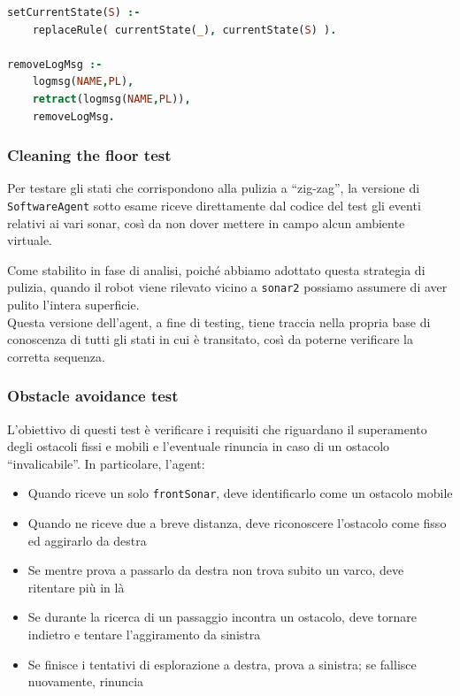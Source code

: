 \documentclass{../llncs}
\newcommand{\codescript}[1]{{\mbox{\small{\texttt{#1}}}}\xspace}
\newcommand{\code}[1]{{\color{blue}\small{\texttt{#1}}}}
\newcommand{\labelssec}[1]{\label{ssec:#1}}
\begin{document}
\begin{lstlisting}[language=Prolog, keywordstyle=\color{black}, caption={swag1 Rules}]
setCurrentState(S) :-
	replaceRule( currentState(_), currentState(S) ).
	 		
removeLogMsg :-
	logmsg(NAME,PL),
	retract(logmsg(NAME,PL)),
	removeLogMsg.
\end{lstlisting}

\subsubsection{Cleaning the floor test}
\labelssec{cleaningTest}
Per testare gli stati che corrispondono alla pulizia a ``zig-zag'', la versione di \codescript{SoftwareAgent} sotto esame riceve direttamente dal codice del test gli eventi relativi ai vari sonar, così da non dover mettere in campo alcun ambiente virtuale.

Come stabilito in fase di analisi, poiché abbiamo adottato questa strategia di pulizia, quando il robot viene rilevato vicino a \code{sonar2} possiamo assumere di aver pulito l'intera superficie.\\



Questa versione dell'agent, a fine di testing, tiene traccia nella propria base di conoscenza di tutti gli stati in cui è transitato, così da poterne verificare la corretta sequenza.\\



\subsubsection{Obstacle avoidance test}
L'obiettivo di questi test è verificare i requisiti che riguardano il superamento degli ostacoli fissi e mobili e l'eventuale rinuncia in caso di un ostacolo ``invalicabile''. In particolare, l'agent:
\begin{itemize}
\item Quando riceve un solo \codescript{frontSonar}, deve identificarlo come un ostacolo mobile
\item Quando ne riceve due a breve distanza, deve riconoscere l'ostacolo come fisso ed aggirarlo da destra
\item Se mentre prova a passarlo da destra non trova subito un varco, deve ritentare più in là
\item Se durante la ricerca di un passaggio incontra un ostacolo, deve tornare indietro e tentare l'aggiramento da sinistra
\item Se finisce i tentativi di esplorazione a destra, prova a sinistra; se fallisce nuovamente, rinuncia
\end{itemize}
\end{document}
